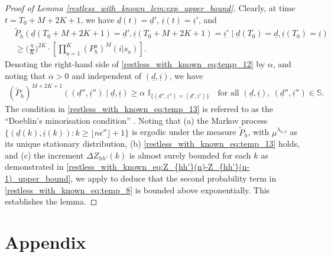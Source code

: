 \begin{proof}[Proof of Lemma \ref{restless_with_known_lem:exp_upper_bound}]
Clearly, at time $t=T_0+M+2K+1$, we have $\underline{d}(t)=\underline{d}'$, $ \underline{i}(t)=\underline{i}'$, and 
\begin{align}
	&\tilde{P}_h(\underline{d}(T_0+M+2K+1)=\underline{d}',\underline{i}(T_0+M+2K+1)=\underline{i}'\mid \underline{d}(T_0)=\underline{d},\underline{i}(T_0)=\underline{i})\nonumber\\
	&\geq \bigg(\frac{\eta}{K}\bigg)^{2K}\cdot \left[\prod\limits_{a=1}^{K}(P_h^a)^{M}(i|s_a)\right]\label{restless_with_known_eq:temp_12}.
\end{align}
Denoting the right-hand side of \eqref{restless_with_known_eq:temp_12} by $\alpha$, and noting that $\alpha>0$ and independent of $(\underline{d}, \underline{i})$, we have
\begin{align}
(\tilde{P}_h)^{M+2K+1}((\underline{d}'',\underline{i}'')\mid \underline{d},\underline{i})\geq \alpha\,\, \mathbb{I}_{\{(\underline{d}'',\underline{i}'')=(\underline{d}',\underline{i}')\}} \quad \text{for all } (\underline{d},\underline{i}),~(\underline{d}'',\underline{i}'')\in\mathbb{S}. \label{restless_with_known_eq:temp_13}
\end{align}
The condition in \eqref{restless_with_known_eq:temp_13} is referred to as the ``Doeblin's minorisation condition''  \cite[Eq. (5)]{kontoyiannis2005relative}. Noting that (a) the Markov process $\{(\underline{d}(k),\underline{i}(k)):k\geq \lfloor n\epsilon''\rfloor+1\}$ is ergodic under the measure $\tilde{P}_h$, with $\mu^{\lambda_{h,\delta}}$ as its unique stationary distribution, (b) \eqref{restless_with_known_eq:temp_13} holds, and (c) the increment  $\Delta Z_{hh'}(k)$ is almost surely bounded for each $k$ as demonstrated in \eqref{restless_with_known_eq:Z_{hh'}(n)-Z_{hh'}(n-1)_upper_bound}, we apply \cite[Theorem 1]{kontoyiannis2005relative} to deduce that the second probability term in \eqref{restless_with_known_eq:temp_8} is bounded above exponentially. This establishes the lemma.
\end{proof}

\section{Appendix}
